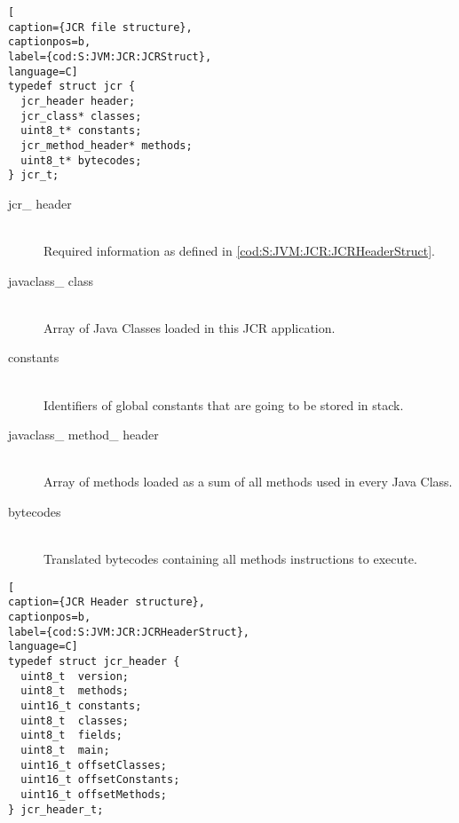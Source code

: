 \medskip
\begin{lstlisting}[
caption={JCR file structure},
captionpos=b,
label={cod:S:JVM:JCR:JCRStruct},
language=C]
typedef struct jcr {
  jcr_header header;
  jcr_class* classes;
  uint8_t* constants;
  jcr_method_header* methods;
  uint8_t* bytecodes;
} jcr_t;
\end{lstlisting}
\medskip

\medskip
\begin{description}
\item[jcr\_ header] \hfill \\
Required information as defined in \ref{cod:S:JVM:JCR:JCRHeaderStruct}.
\item[javaclass\_ class] \hfill \\
Array of Java Classes loaded in this JCR application.
\item[constants] \hfill \\
Identifiers of global constants that are going to be stored in stack.
\item[javaclass\_ method\_ header] \hfill \\
Array of methods loaded as a sum of all methods used in every Java Class.
\item[bytecodes] \hfill \\
Translated bytecodes containing all methods instructions to execute.
\end{description}
\medskip

\medskip
\begin{lstlisting}[
caption={JCR Header structure},
captionpos=b,
label={cod:S:JVM:JCR:JCRHeaderStruct},
language=C]
typedef struct jcr_header {
  uint8_t  version;
  uint8_t  methods;
  uint16_t constants;
  uint8_t  classes;
  uint8_t  fields;
  uint8_t  main;
  uint16_t offsetClasses;
  uint16_t offsetConstants;
  uint16_t offsetMethods;
} jcr_header_t;
\end{lstlisting}
\medskip

